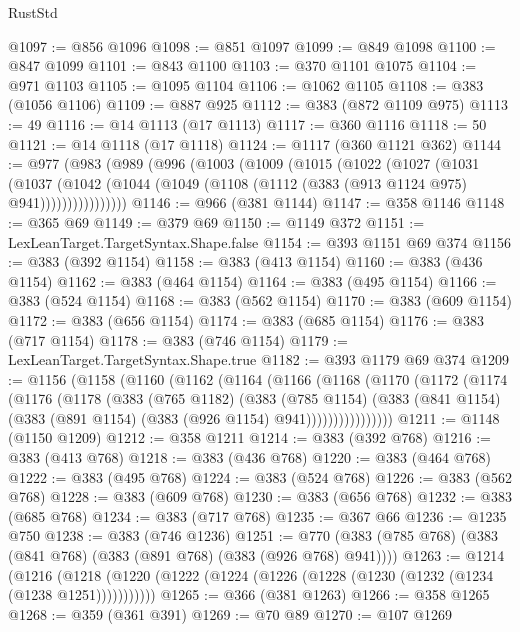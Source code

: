 \begin{lexlean}{RustStd}
\begin{coremodule}
@1097 := @856 @1096
@1098 := @851 @1097
@1099 := @849 @1098
@1100 := @847 @1099
@1101 := @843 @1100
@1103 := @370 @1101 @1075
@1104 := @971 @1103
@1105 := @1095 @1104
@1106 := @1062 @1105
@1108 := @383 (@1056 @1106)
@1109 := @887 @925
@1112 := @383 (@872 @1109 @975)
@1113 := 49
@1116 := @14 @1113 (@17 @1113)
@1117 := @360 @1116
@1118 := 50
@1121 := @14 @1118 (@17 @1118)
@1124 := @1117 (@360 @1121 @362)
@1144 := @977
    (@983
      (@989
        (@996
          (@1003
            (@1009
              (@1015
                (@1022
                  (@1027
                    (@1031
                      (@1037
                        (@1042
                          (@1044 (@1049 (@1108 (@1112 (@383 (@913 @1124 @975) @941))))))))))))))))
@1146 := @966 (@381 @1144)
@1147 := @358 @1146
@1148 := @365 @69
@1149 := @379 @69
@1150 := @1149 @372
@1151 := LexLeanTarget.TargetSyntax.Shape.false
@1154 := @393 @1151 @69 @374
@1156 := @383 (@392 @1154)
@1158 := @383 (@413 @1154)
@1160 := @383 (@436 @1154)
@1162 := @383 (@464 @1154)
@1164 := @383 (@495 @1154)
@1166 := @383 (@524 @1154)
@1168 := @383 (@562 @1154)
@1170 := @383 (@609 @1154)
@1172 := @383 (@656 @1154)
@1174 := @383 (@685 @1154)
@1176 := @383 (@717 @1154)
@1178 := @383 (@746 @1154)
@1179 := LexLeanTarget.TargetSyntax.Shape.true
@1182 := @393 @1179 @69 @374
@1209 := @1156
    (@1158
      (@1160
        (@1162
          (@1164
            (@1166
              (@1168
                (@1170
                  (@1172
                    (@1174
                      (@1176
                        (@1178
                          (@383
                            (@765 @1182)
                            (@383
                              (@785 @1154)
                              (@383
                                (@841 @1154)
                                (@383 (@891 @1154) (@383 (@926 @1154) @941))))))))))))))))
@1211 := @1148 (@1150 @1209)
@1212 := @358 @1211
@1214 := @383 (@392 @768)
@1216 := @383 (@413 @768)
@1218 := @383 (@436 @768)
@1220 := @383 (@464 @768)
@1222 := @383 (@495 @768)
@1224 := @383 (@524 @768)
@1226 := @383 (@562 @768)
@1228 := @383 (@609 @768)
@1230 := @383 (@656 @768)
@1232 := @383 (@685 @768)
@1234 := @383 (@717 @768)
@1235 := @367 @66
@1236 := @1235 @750
@1238 := @383 (@746 @1236)
@1251 := @770 (@383 (@785 @768) (@383 (@841 @768) (@383 (@891 @768) (@383 (@926 @768) @941))))
@1263 := @1214
    (@1216 (@1218 (@1220 (@1222 (@1224 (@1226 (@1228 (@1230 (@1232 (@1234 (@1238 @1251)))))))))))
@1265 := @366 (@381 @1263)
@1266 := @358 @1265
@1268 := @359 (@361 @391)
@1269 := @70 @89
@1270 := @107 @1269

\end{coremodule}
\end{lexlean}
